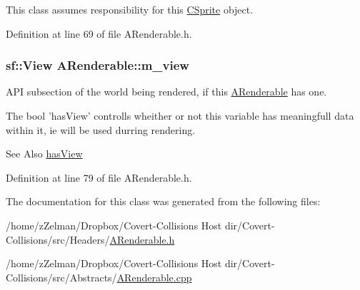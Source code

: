 This class assumes responsibility for this \hyperlink{classCSprite}{C\-Sprite} object. 



Definition at line 69 of file A\-Renderable.\-h.

\hypertarget{classARenderable_a9385344aed3d507e828e5b20c8846f4a}{
\subsubsection[{m\-\_\-view}]{\setlength{\rightskip}{0pt plus 5cm}sf\-::\-View A\-Renderable\-::m\-\_\-view\hspace{0.3cm}{\ttfamily [protected]}}}\label{classARenderable_a9385344aed3d507e828e5b20c8846f4a}


A\-P\-I subsection of the world being rendered, if this \hyperlink{classARenderable}{A\-Renderable} has one. 

The bool 'has\-View' controlls wheither or not this variable has meaningfull data within it, ie will be used durring rendering.

\begin{DoxySeeAlso}{See Also}
\hyperlink{classARenderable_a7975927d5e1b3cffb6b51b8e058fcb51}{has\-View} 
\end{DoxySeeAlso}


Definition at line 79 of file A\-Renderable.\-h.



The documentation for this class was generated from the following files\-:\begin{DoxyCompactItemize}
\item 
/home/z\-Zelman/\-Dropbox/\-Covert-\/\-Collisions Host dir/\-Covert-\/\-Collisions/src/\-Headers/\hyperlink{ARenderable_8h}{A\-Renderable.\-h}\item 
/home/z\-Zelman/\-Dropbox/\-Covert-\/\-Collisions Host dir/\-Covert-\/\-Collisions/src/\-Abstracts/\hyperlink{ARenderable_8cpp}{A\-Renderable.\-cpp}\end{DoxyCompactItemize}
